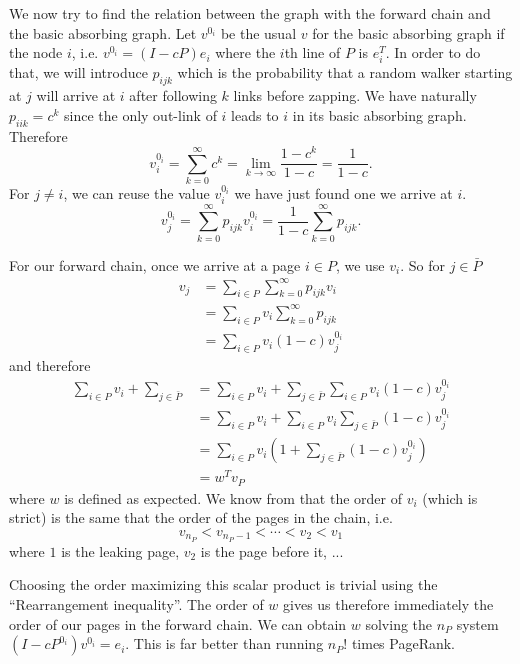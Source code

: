 \documentclass{article}
\newcommand{\1}{\mathbf{1}}
\theoremstyle{definition}
\begin{document}
We now try to find the relation between the graph with the forward chain and the basic absorbing graph.
Let $v^{0_i}$ be the usual $v$ for the basic absorbing graph if the node $i$,
i.e. $v^{0_i} = (I - cP)e_i$ where the $i$th line of $P$ is $e_i^T$.
In order to do that, we will introduce $p_{ijk}$ which is the probability that a random walker starting at $j$
will arrive at $i$ after following $k$ links before zapping.
We have naturally $p_{iik} = c^k$ since the only out-link of $i$ leads to $i$ in its basic absorbing graph.
Therefore
\[ v_i^{0_i} = \sum_{k=0}^\infty c^k = \lim_{k \to \infty} \frac{1-c^k}{1-c} = \frac{1}{1-c}. \]
For $j \neq i$, we can reuse the value $v_i^{0_i}$ we have just found one we arrive at $i$.
\[ v_j^{0_i} = \sum_{k=0}^\infty p_{ijk} v_i^{0_i} = \frac{1}{1-c} \sum_{k=0}^\infty p_{ijk}. \]

For our forward chain,
once we arrive at a page $i \in P$, we use $v_i$.
So for $j \in \bar{P}$
\begin{align*}
  v_j & = \sum_{i \in P} \sum_{k = 0}^\infty p_{ijk} v_i\\
      & = \sum_{i \in P} v_i \sum_{k = 0}^\infty p_{ijk}\\
      & = \sum_{i \in P} v_i (1-c) v_j^{0_i}
\end{align*}
and therefore
\begin{align*}
  \sum_{i \in P} v_i + \sum_{j \in \bar{P}}
  & = \sum_{i \in P} v_i + \sum_{j \in \bar{P}} \sum_{i \in P} v_i (1-c) v_j^{0_i}\\
  & = \sum_{i \in P} v_i + \sum_{i \in P} v_i \sum_{j \in \bar{P}} (1-c) v_j^{0_i}\\
  & = \sum_{i \in P} v_i \left(1 + \sum_{j \in \bar{P}} (1-c) v_j^{0_i}\right)\\
  & = w^T v_P
\end{align*}
where $w$ is defined as expected.
We know from \cite{de2008maximizing} that the order of $v_i$ (which is strict) is the same that
the order of the pages in the chain, i.e.
\[ v_{n_P} < v_{n_P-1} < \cdots < v_2 < v_1 \]
where $1$ is the leaking page, $v_2$ is the page before it, ...

Choosing the order maximizing this scalar product is trivial using the ``Rearrangement inequality''.
The order of $w$ gives us therefore immediately the order of our pages in the forward chain.
We can obtain $w$ solving the $n_P$ system $(I - cP^{0_i})v^{0_i} = e_i$.
This is far better than running $n_P!$ times PageRank.
\end{document}
